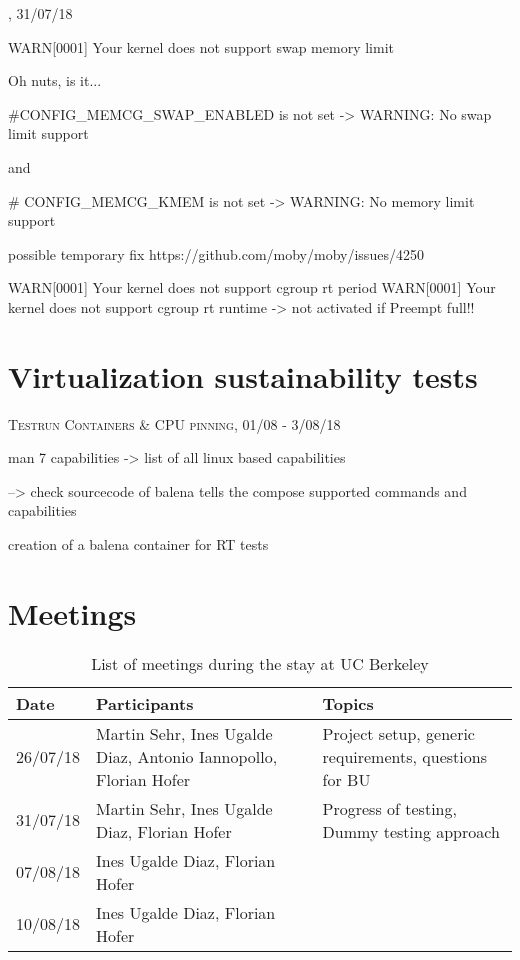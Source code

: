 \documentclass[]{scrartcl}
\begin{document}
{\small\textsc{, 31/07/18} \bigskip}



WARN[0001] Your kernel does not support swap memory limit 

Oh nuts, is it...

#CONFIG_MEMCG_SWAP_ENABLED is not set -> WARNING: No swap limit support

and

# CONFIG_MEMCG_KMEM is not set -> WARNING: No memory limit support

possible temporary fix https://github.com/moby/moby/issues/4250



WARN[0001] Your kernel does not support cgroup rt period 
WARN[0001] Your kernel does not support cgroup rt runtime 
-> not activated if Preempt full!!

\section{Virtualization sustainability tests}

{\small\textsc{Testrun Containers \& CPU pinning, 01/08 - 3/08/18} \bigskip}



man 7 capabilities  -> list of all linux based capabilities


--> check sourcecode of balena tells the compose supported commands and capabilities

creation of a balena container for RT tests


\section{Meetings}

\begin{table}
	\centering
	\caption{List of meetings during the stay at UC Berkeley}
	
	\begin{tabular}{l l l}
	Date & Participants & Topics \\
	\hline
	26/07/18 & Martin Sehr, Ines Ugalde Diaz, Antonio Iannopollo, Florian Hofer & Project setup, generic requirements, questions for BU\\
	31/07/18 & Martin Sehr, Ines Ugalde Diaz, Florian Hofer & Progress of testing, Dummy testing approach\\
	07/08/18 & Ines Ugalde Diaz, Florian Hofer & \\
	10/08/18 & Ines Ugalde Diaz, Florian Hofer & \\
	\hline
	\end{tabular}
	
	\label{tab:meeting}
\end{table}
\end{document}
